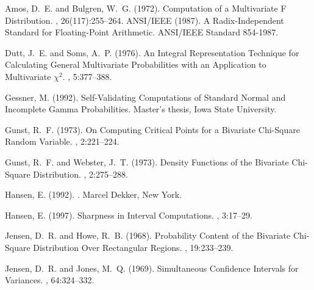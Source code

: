 \documentclass[10pt,letterpaper]{article}
\begin{document}
\begin{thebibliography}{}

Amos, D.~E. and Bulgren, W.~G. (1972).
\newblock Computation of a {M}ultivariate {F} {D}istribution.
, 26(117):255--264.
ANSI/IEEE (1987).
\newblock A {R}adix-{I}ndependent {S}tandard for {F}loating-{P}oint
{A}rithmetic.
\newblock ANSI/IEEE Standard 854-1987.

Dutt, J.~E. and Soms, A.~P. (1976).
\newblock An {I}ntegral {R}epresentation {T}echnique for {C}alculating
  {G}eneral {M}ultivariate {P}robabilities with an {A}pplication to
  {M}ultivariate $\chi^2$.
, 5:377--388.

Gessner, M. (1992).
\newblock Self-{V}alidating {C}omputations of {S}tandard {N}ormal and
  {I}ncomplete {G}amma {P}robabilities.
\newblock Master's thesis, Iowa State University.

Gunst, R.~F. (1973).
\newblock On {C}omputing {C}ritical {P}oints for a {B}ivariate {C}hi-{S}quare
  {R}andom {V}ariable.
, 2:221--224.

Gunst, R.~F. and Webster, J.~T. (1973).
\newblock Density {F}unctions of the {B}ivariate {C}hi-{S}quare {D}istribution.
, 2:275--288.

Hansen, E. (1992).
.
\newblock Marcel Dekker, New York.

Hansen, E. (1997).
\newblock Sharpness in {I}nterval {C}omputations.
, 3:17--29.

Jensen, D.~R. and Howe, R.~B. (1968).
\newblock Probability {C}ontent of the {B}ivariate {C}hi-{S}quare
  {D}istribution {O}ver {R}ectangular {R}egions.
, 19:233--239.

Jensen, D.~R. and Jones, M.~Q. (1969).
\newblock Simultaneous {C}onfidence {I}ntervals for {V}ariances.
,
  64:324--332.


\end{thebibliography}
\end{document}
